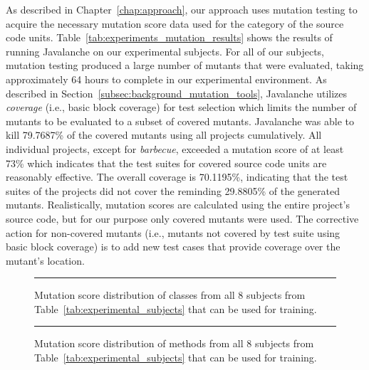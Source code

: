 \noindent
As described in Chapter~\ref{chap:approach}, our approach uses mutation testing to acquire the necessary mutation score data used for the category of the source code units. Table~\ref{tab:experiments_mutation_results} shows the results of running Javalanche on our experimental subjects. For all of our subjects, mutation testing produced a large number of mutants that were evaluated, taking approximately 64 hours to complete in our experimental environment. As described in Section~\ref{subsec:background_mutation_tools}, Javalanche utilizes \emph{coverage} (i.e., basic block coverage) for test selection which limits the number of mutants to be evaluated to a subset of covered mutants. Javalanche was able to kill 79.7687\% of the covered mutants using all projects cumulatively. All individual projects, except for \emph{barbecue}, exceeded a mutation score of at least 73\% which indicates that the test suites for covered source code units are reasonably effective. The overall coverage is 70.1195\%, indicating that the test suites of the projects did not cover the reminding 29.8805\% of the generated mutants. Realistically, mutation scores are calculated using the entire project's source code, but for our purpose only covered mutants were used. The corrective action for non-covered mutants (i.e., mutants not covered by test suite using basic block coverage) is to add new test cases that provide coverage over the mutant's location.

\begin{figure}[!ht]
  \centering
  \caption{Mutation score distribution of classes from all 8 subjects from Table~\ref{tab:experimental_subjects} that can be used for training.}
  \vspace{2mm}
  \hrule
  \label{fig:mutation_distributions_class_all}
\end{figure}

\begin{figure}[!ht]
  \centering
  \caption{Mutation score distribution of methods from all 8 subjects from Table~\ref{tab:experimental_subjects} that can be used for training.}
  \vspace{2mm}
  \hrule
  \label{fig:mutation_distributions_method_all}
\end{figure}

